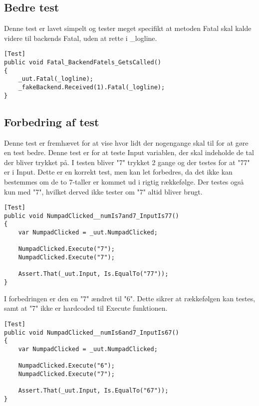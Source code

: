 \subsection{Bedre test}
Denne test er lavet simpelt og tester meget specifikt at metoden Fatal skal kalde videre til backends Fatal, uden at rette i \_logline.

\begin{lstlisting}
[Test]
public void Fatal_BackendFatels_GetsCalled()
{
    _uut.Fatal(_logline);
    _fakeBackend.Received(1).Fatal(_logline);
}
\end{lstlisting}


\subsection{Forbedring af test}
Denne test er fremhævet for at vise hvor lidt der nogengange skal til for at gøre en test bedre. Denne test er for at teste Input variablen, der skal indeholde de tal der bliver trykket på. I testen bliver "7" trykket 2 gange og der testes for at "77" er i Input. Dette er en korrekt test, men kan let forbedres, da det ikke kan bestemmes om de to 7-taller er kommet ud i rigtig rækkefølge. Der testes også kun med "7", hvilket derved ikke tester om "7" altid bliver brugt.
\begin{lstlisting}
[Test]
public void NumpadClicked__numIs7and7_InputIs77()
{
    var NumpadClicked = _uut.NumpadClicked;

    NumpadClicked.Execute("7");
    NumpadClicked.Execute("7");

    Assert.That(_uut.Input, Is.EqualTo("77"));
}
\end{lstlisting}


I forbedringen er den en "7" ændret til "6". Dette sikrer at rækkefølgen kan testes, samt at "7" ikke er hardcoded til Execute funktionen.
\begin{lstlisting}
[Test]
public void NumpadClicked__numIs6and7_InputIs67()
{
    var NumpadClicked = _uut.NumpadClicked;

    NumpadClicked.Execute("6");
    NumpadClicked.Execute("7");

    Assert.That(_uut.Input, Is.EqualTo("67"));
}
\end{lstlisting}

